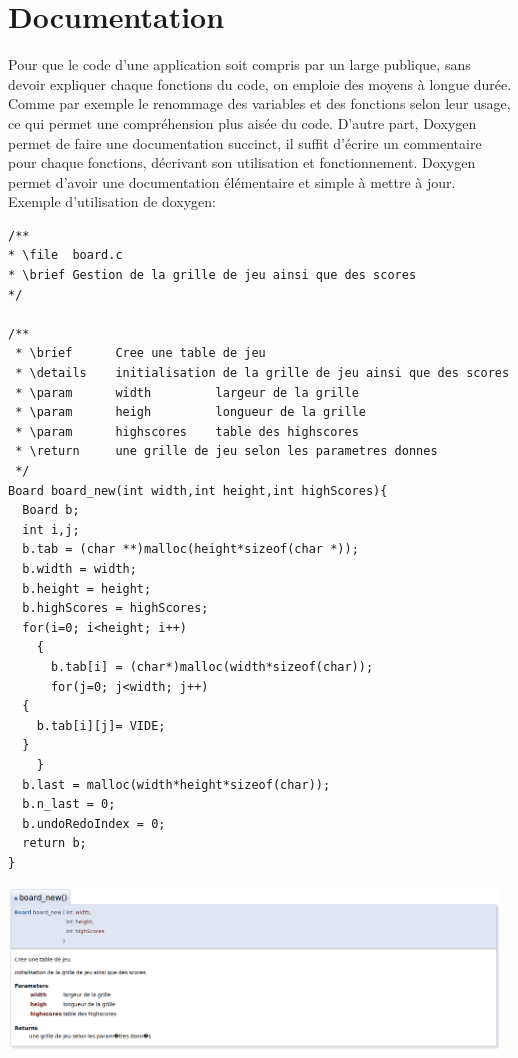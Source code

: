 \documentclass{report}
\begin{document}
\section{Documentation}
Pour que le code d'une application soit compris par un large publique, sans devoir expliquer chaque fonctions du code, on emploie des moyens à longue durée. Comme par exemple le renommage des variables et des fonctions selon leur usage, ce qui permet une compréhension plus aisée du code. D'autre part, Doxygen permet de faire une documentation succinct, il suffit d'écrire un commentaire pour chaque fonctions, décrivant son utilisation et fonctionnement. Doxygen permet d'avoir une documentation élémentaire et simple à mettre à jour.
Exemple d'utilisation de doxygen:
\begin{scriptsize}
\begin{lstlisting}
/**
* \file  board.c
* \brief Gestion de la grille de jeu ainsi que des scores 
*/

/**
 * \brief      Cree une table de jeu
 * \details    initialisation de la grille de jeu ainsi que des scores
 * \param      width         largeur de la grille
 * \param      heigh         longueur de la grille
 * \param      highscores    table des highscores
 * \return     une grille de jeu selon les parametres donnes
 */
Board board_new(int width,int height,int highScores){
  Board b;
  int i,j;
  b.tab = (char **)malloc(height*sizeof(char *));
  b.width = width;
  b.height = height;
  b.highScores = highScores;
  for(i=0; i<height; i++)
    {
      b.tab[i] = (char*)malloc(width*sizeof(char));
      for(j=0; j<width; j++)
  {
    b.tab[i][j]= VIDE;
  }
    }
  b.last = malloc(width*height*sizeof(char));
  b.n_last = 0;
  b.undoRedoIndex = 0;
  return b;
}

\end{lstlisting}
\end{scriptsize}
\begin{center}
\includegraphics[width=13cm]{board.png}
\end{center}
\end{document}
